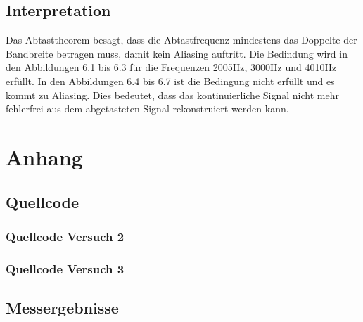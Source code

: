 \documentclass[12pt, oneside, a4paper, \docLanguage]{report}
\begin{document}
\section{Interpretation}
\label{chap:VERSUCH_3_INTERPRETATION}
Das Abtasttheorem besagt, dass die Abtastfrequenz mindestens das Doppelte der Bandbreite betragen muss, damit kein Aliasing auftritt. Die Bedindung wird in den Abbildungen 6.1 bis 6.3 für die Frequenzen 2005Hz, 3000Hz und 4010Hz erfüllt. In den Abbildungen 6.4 bis 6.7 ist die Bedingung nicht erfüllt und es kommt zu Aliasing. Dies bedeutet, dass das kontinuierliche Signal nicht mehr fehlerfrei aus dem abgetasteten Signal rekonstruiert werden kann.

%
%
\renewcommand\thesection{A.\arabic{section}}
\renewcommand\thesubsection{\thesection.\arabic{subsection}}

\chapter*{Anhang}
\label{chap:APPENDIX}
\addtocounter{chapter}{1}
\setcounter{section}{0}

\section{Quellcode}
\label{chap:APPENDIX_SOURCECODE}

\subsection{Quellcode Versuch 2}
\label{chap:APPENDIX_SOURCECODE_V2}


\subsection{Quellcode Versuch 3}
\label{chap:APPENDIX_SOURCECODE_V3}


\section{Messergebnisse}
\label{chap:APPENDIX_MEASUREMENT_SOURCE}
\end{document}
